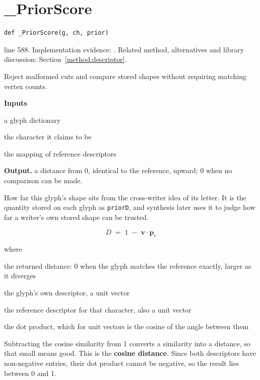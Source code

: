 \section{\_PriorScore}\label{fn:style:-PriorScore}
\begin{lstlisting}[style=sig]
def _PriorScore(g, ch, prior)
\end{lstlisting}
 line 588. Implementation evidence: \cite{code2026}. Related method, alternatives and library discussion: Section~\ref{method:descriptor}.


Reject malformed cuts and compare stored shapes without requiring matching vertex counts.




\noindent\textbf{Inputs}
\begin{description}[leftmargin=2.2em,style=nextline,font=\normalfont\ttfamily]\setlength\itemsep{1pt}
  \item[{g}] \normalfont a glyph dictionary
  \item[{ch}] \normalfont the character it claims to be
  \item[{prior}] \normalfont the mapping of reference descriptors
\end{description}

\noindent\textbf{Output.} a distance from 0, identical to the reference, upward; 0 when no comparison can be made.


How far this glyph's shape sits from the cross-writer idea of its letter. It is the quantity stored on each glyph as \texttt{priorD}, and synthesis later uses it to judge how far a writer's own stored shape can be trusted.


\begin{equation}
D \;=\; 1 \;-\; \mathbf{v} \cdot \mathbf{p}_c
\end{equation}

\noindent where
\begin{description}[leftmargin=2.4em,style=nextline,font=\normalfont\ttfamily]\setlength\itemsep{1pt}
  \item[{$D$}] \normalfont the returned distance: 0 when the glyph matches the reference exactly, larger as it diverges
  \item[{$\mathbf{v}$}] \normalfont the glyph's own descriptor, a unit vector
  \item[{$\mathbf{p}_c$}] \normalfont the reference descriptor for that character, also a unit vector
  \item[{$\cdot$}] \normalfont the dot product, which for unit vectors is the cosine of the angle between them
\end{description}
Subtracting the cosine similarity from 1 converts a similarity into a distance, so that small means good. This is the \textbf{cosine distance}. Since both descriptors have non-negative entries, their dot product cannot be negative, so the result lies between 0 and 1.


